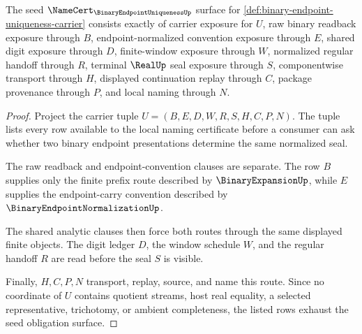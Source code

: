 \begin{theorem}
\label{thm:binary-endpoint-uniqueness-namecert-obligations}
The seed $\NameCert_{\BinaryEndpointUniquenessUp}$ surface for \autoref{def:binary-endpoint-uniqueness-carrier} consists exactly of carrier exposure for $U$, raw binary readback exposure through $B$, endpoint-normalized convention exposure through $E$, shared digit exposure through $D$, finite-window exposure through $W$, normalized regular handoff through $R$, terminal $\RealUp$ seal exposure through $S$, componentwise transport through $H$, displayed continuation replay through $C$, package provenance through $P$, and local naming through $N$.
\end{theorem}
\begin{proof}
Project the carrier tuple $U=(B,E,D,W,R,S,H,C,P,N)$. The tuple lists every row available to the local naming certificate before a consumer can ask whether two binary endpoint presentations determine the same normalized seal.

The raw readback and endpoint-convention clauses are separate. The row $B$ supplies only the finite prefix route described by $\BinaryExpansionUp$, while $E$ supplies the endpoint-carry convention described by $\BinaryEndpointNormalizationUp$.

The shared analytic clauses then force both routes through the same displayed finite objects. The digit ledger $D$, the window schedule $W$, and the regular handoff $R$ are read before the seal $S$ is visible.

Finally, $H,C,P,N$ transport, replay, source, and name this route. Since no coordinate of $U$ contains quotient streams, host real equality, a selected representative, trichotomy, or ambient completeness, the listed rows exhaust the seed obligation surface.
\end{proof}

